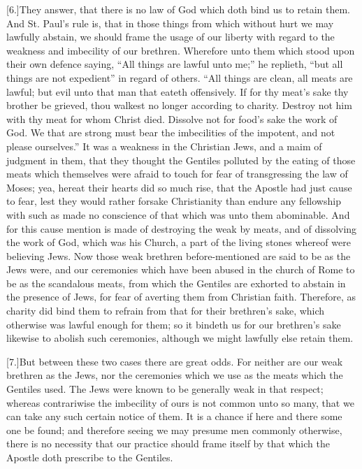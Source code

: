 [6.]They answer, that there is no law of God which doth bind us to retain them. And St. Paul’s rule is, that in those things from which without hurt we may lawfully abstain, we should frame the usage of our liberty with regard to the weakness and imbecility of our brethren. Wherefore unto them which stood upon their own defence saying, “All things are lawful unto me;” he replieth, “but all things are not expedient” in regard of others. “All things are clean, all meats are lawful; but evil unto that man that eateth offensively. If for thy meat’s sake thy brother be grieved, thou walkest no longer according to charity. Destroy not him with thy meat for whom Christ died. Dissolve not for food’s sake the work of God. We that are strong must bear the imbecilities of the impotent, and not please ourselves.” It was a weakness in the Christian Jews, and a maim of judgment in them, that they thought the Gentiles polluted by the eating of those meats which themselves were afraid to touch for fear of transgressing the law of Moses; yea, hereat their hearts did so much rise, that the Apostle had just cause to fear, lest they would rather forsake Christianity than endure any fellowship with such as made no conscience of that which was unto them abominable. And for this cause mention is made of destroying the weak by meats, and of dissolving the work of God, which was his Church, a part of the living stones whereof were believing Jews. Now those weak brethren before-mentioned are said to be as the Jews were, and our ceremonies which have been abused in the church of Rome to be as the scandalous meats, from which the Gentiles are exhorted to abstain in the presence of Jews, for fear of averting them from Christian faith. Therefore, as charity did bind them to refrain from that for their brethren’s sake, which otherwise was lawful enough for them; so it  bindeth us for our brethren’s sake likewise to abolish such ceremonies, although we might lawfully else retain them.

[7.]But between these two cases there are great odds. For neither are our weak brethren as the Jews, nor the ceremonies which we use as the meats which the Gentiles used. The Jews were known to be generally weak in that respect; whereas contrariwise the imbecility of ours is not common unto so many, that we can take any such certain notice of them. It is a chance if here and there some one be found; and therefore seeing we may presume men commonly otherwise, there is no necessity that our practice should frame itself by that which the Apostle doth prescribe to the Gentiles.

